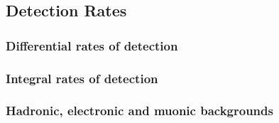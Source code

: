 \subsection{Detection Rates}

\subsubsection{Differential rates of detection}

\subsubsection{Integral rates of detection}

\subsubsection{Hadronic, electronic and muonic backgrounds}

\endinput
%

